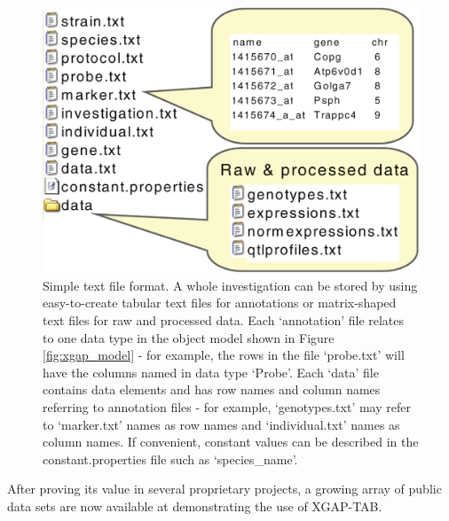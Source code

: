 \begin{figure}
	\includegraphics[width=1.0\linewidth]{img/xgap_format}
	\caption[Simple text file format]{Simple text file format. A whole investigation can be stored by using easy-to-create tabular text files for annotations or matrix-shaped text files for raw and processed data. Each ‘annotation’ file relates to one data type in the object model shown in Figure \ref{fig:xgap_model} - for example, the rows in the file ‘probe.txt’ will have the columns named in data type ‘Probe’. Each ‘data’ file contains data elements and has row names and column names referring to annotation files - for example, ‘genotypes.txt’ may refer to ‘marker.txt’ names as row names and ‘individual.txt’ names as column names. If convenient, constant values can be described in the constant.properties file such as ‘species\_name’.}
	\label{fig:xgap_format}
\end{figure}

After proving its value in several proprietary projects, a growing array of public data sets are now available at\cite{xgap_datasets} demonstrating the use of XGAP-TAB\cite{Heap_2009, Bystrykh_2005, Li_2006, Keurentjes_2007, Stranger_2007b, Myers_2007}.

